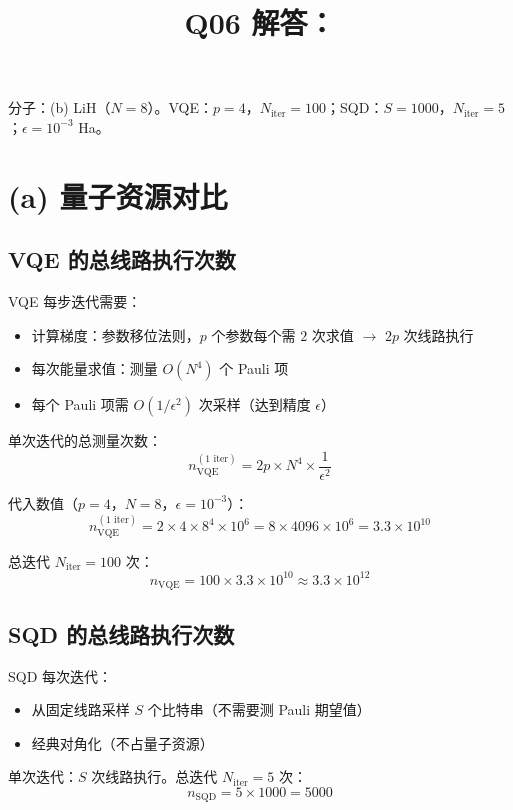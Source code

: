 \documentclass[11pt,a4paper]{article}
\title{Q06 解答：}
\author{}
\date{}
\begin{document}
\maketitle

分子：(b) LiH（$N = 8$）。VQE：$p = 4$，$N_{\text{iter}} = 100$；SQD：$S = 1000$，$N_{\text{iter}} = 5$；$\epsilon = 10^{-3}$ Ha。

\section{(a) 量子资源对比}

\subsection{VQE 的总线路执行次数}

VQE 每步迭代需要：
\begin{itemize}
  \item 计算梯度：参数移位法则，$p$ 个参数每个需 $2$ 次求值 $\to$ $2p$ 次线路执行
  \item 每次能量求值：测量 $O(N^4)$ 个 Pauli 项
  \item 每个 Pauli 项需 $O(1/\epsilon^2)$ 次采样（达到精度 $\epsilon$）
\end{itemize}

单次迭代的总测量次数：
$$n_{\text{VQE}}^{(\text{1 iter})} = 2p \times N^4 \times \frac{1}{\epsilon^2}$$

代入数值（$p = 4$，$N = 8$，$\epsilon = 10^{-3}$）：
$$n_{\text{VQE}}^{(\text{1 iter})} = 2 \times 4 \times 8^4 \times 10^6 = 8 \times 4096 \times 10^6 = 3.3 \times 10^{10}$$

总迭代 $N_{\text{iter}} = 100$ 次：
$$\boxed{n_{\text{VQE}} = 100 \times 3.3 \times 10^{10} \approx 3.3 \times 10^{12}}$$

\subsection{SQD 的总线路执行次数}

SQD 每次迭代：
\begin{itemize}
  \item 从固定线路采样 $S$ 个比特串（不需要测 Pauli 期望值）
  \item 经典对角化（不占量子资源）
\end{itemize}

单次迭代：$S$ 次线路执行。总迭代 $N_{\text{iter}} = 5$ 次：
$$\boxed{n_{\text{SQD}} = 5 \times 1000 = 5000}$$
\end{document}
